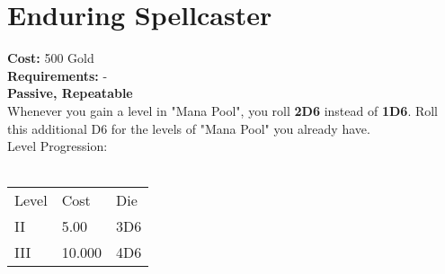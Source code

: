 \section{Enduring Spellcaster}\label{sec:enduringspellcaster}
\textbf{Cost:} 500 Gold\\
\textbf{Requirements:} -\\
\textbf{Passive, Repeatable}\\
Whenever you gain a level in "Mana Pool", you roll \textbf{2D6} instead of \textbf{1D6}.
Roll this additional D6 for the levels of "Mana Pool" you already have.
\\
Level Progression:\\
\\
\begin{tabular}{l | l | l }
	Level & Cost & Die\\
	II & 5.00 & 3D6 \\
	III & 10.000 & 4D6\\
\end{tabular}